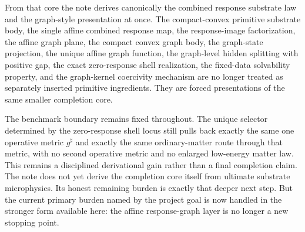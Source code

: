 \documentclass[11pt]{article}
\newcommand{\CompletedMetric}{g^{\sharp}}
\begin{document}
From that core the note derives canonically the combined response substrate law and the graph-style presentation at once. The compact-convex primitive substrate body, the single affine combined response map, the response-image factorization, the affine graph plane, the compact convex graph body, the graph-state projection, the unique affine graph function, the graph-level hidden splitting with positive gap, the exact zero-response shell realization, the fixed-data solvability property, and the graph-kernel coercivity mechanism are no longer treated as separately inserted primitive ingredients. They are forced presentations of the same smaller completion core.

The benchmark boundary remains fixed throughout. The unique selector determined by the zero-response shell locus still pulls back exactly the same one operative metric \(\CompletedMetric\) and exactly the same ordinary-matter route through that metric, with no second operative metric and no enlarged low-energy matter law. This remains a disciplined derivational gain rather than a final completion claim. The note does not yet derive the completion core itself from ultimate substrate microphysics. Its honest remaining burden is exactly that deeper next step. But the current primary burden named by the project goal is now handled in the stronger form available here: the affine response-graph layer is no longer a new stopping point.
\end{document}
